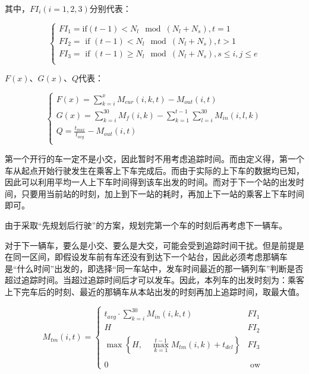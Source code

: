 其中，$FI_i(i=1,2,3)$分别代表：

\begin{equation*}
    \begin{cases}
        FI_1 = \text{if}(t-1)<N_l\mod(N_l+N_s), t = 1  \\
        FI_2 = \text{ if } (t - 1) < N_l \mod (N_l + N_s), t > 1    \\
        FI_3 = \text{ if } (t - 1) \geq N_l \mod (N_l + N_s), s \leq i, j \leq e \\
    \end{cases}
\end{equation*}

$F(x)$、$G(x)$、$Q$代表：

\begin{equation*}
    \begin{cases}
        F(x) = \sum _{k = i} ^{x} M_{cur}(i, k, t) - M_{out}(i, t)  \\
        G(x) = \sum _{k = i} ^{30} M_f(i, k) - \sum _{k = 1} ^{t - 1} \sum _{l = i} ^{30} M_{in}(i, l, k)   \\
        Q = \frac {t_{max}} {t_{avg}} - M_{out}(i, t)   \\
    \end{cases}
\end{equation*}


第一个开行的车一定不是小交，因此暂时不用考虑追踪时间。而由定义得，第一个车从起点开始行驶发生在乘客上下车完成后。而由于实际的上下车的数据均已知，因此可以利用平均一人上下车时间得到该车出发的时间。而对于下一个站的出发时间，只要用当前站的时刻，加上到下一站的耗时，再加上下一站的乘客上下车时间即可。

由于采取“先规划后行驶”的方案，规划完第一个车的时刻后再考虑下一辆车。

对于下一辆车，要么是小交、要么是大交，可能会受到追踪时间干扰。但是前提是在同一区间，即假设发车前有车还没有到达下一个站台，因此必须考虑那辆车是“什么时间”出发的，即选择“同一车站中，发车时间最近的那一辆列车”判断是否超过追踪时间。当超过追踪时间后才可以发车。因此，本列车的出发时刻为：乘客上下完车后的时刻、最近的那辆车从本站出发的时刻再加上追踪时间，取最大值。

\begin{equation}
M_{tm}(i, t) = 
	\begin{cases}
		t_{avg} \cdot \sum _{k = i} ^{30} M_{in}(i, k, t) &  FI_1\\
		H & FI_2\\
		\max \left\{ 
			H, \quad
			\max _{k = 1} ^{t - 1}M_{tm}(i, k) + t_{del}
		\right\} & FI_3\\
		 \\
		0 & \text{ ow }
	\end{cases}
\end{equation}

